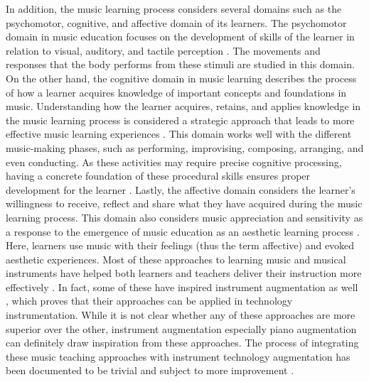 \documentclass[sigconf, screen, review]{acmart}
\begin{document}
In addition, the music learning process considers several domains such as the psychomotor, cognitive, and affective domain of its learners. The psychomotor domain in music education focuses on the development of skills of the learner in relation to visual, auditory, and tactile perception \cite{simpson1966classification}. The movements and responses that the body performs from these stimuli are studied in this domain. On the other hand, the cognitive domain in music learning describes the process of how a learner acquires knowledge of important concepts and foundations in music. Understanding how the learner acquires, retains, and applies knowledge in the music learning process is considered a strategic approach that leads to more effective music learning experiences \cite{hanna2007new}. This domain works well with the different music-making phases, such as performing, improvising, composing, arranging, and even conducting. As these activities may require precise cognitive processing, having a concrete foundation of these procedural skills ensures proper development for the learner \cite{westerlund2003reconsidering}. Lastly, the affective domain considers the learner's willingness to receive, reflect and share what they have acquired during the music learning process. This domain also considers music appreciation and sensitivity as a response to the emergence of music education as an aesthetic learning process \cite{mccarthy2002music}. Here, learners use music with their feelings (thus the term affective) and evoked aesthetic experiences. Most of these approaches to learning music and musical instruments have helped both learners and teachers deliver their instruction more effectively \cite{burns2020using}. In fact, some of these have inspired instrument augmentation as well \cite{howard1996kodaly, burns2020using, blackshaw2020wearing, anggoro2020study, comeau2012playing}, which proves that their approaches can be applied in technology instrumentation. While it is not clear whether any of these approaches are more superior over the other, instrument augmentation especially piano augmentation can definitely draw inspiration from these approaches. The process of integrating these music teaching approaches with instrument technology augmentation has been documented to be trivial and subject to more improvement \cite{beckstead2001will}. 
\end{document}
